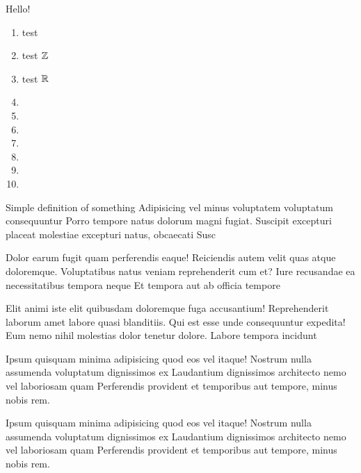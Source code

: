 \documentclass{article}
\begin{document}
    \maketitle[small]
    Hello!
    \begin{enumerate}[label=\listALPHP]
        \item test \nsN{}
        \item test \(\mathbb{Z}{}\)
        \item test \(\mathbb{R}{}\)
        \item {}
        \item {}    
        \item {}
        \item {}
        \item {}  
        \item {} 
        \item {} 
    \end{enumerate}
    \begin{definition}
        Simple definition of something Adipisicing vel minus voluptatem voluptatum consequuntur Porro tempore natus dolorum magni fugiat. Suscipit excepturi placeat molestiae excepturi natus, obcaecati Susc
    \end{definition}
    \begin{theorem}
        Dolor earum fugit quam perferendis eaque! Reiciendis autem velit quas atque doloremque. Voluptatibus natus veniam reprehenderit cum et? Iure recusandae ea necessitatibus tempora neque Et tempora aut ab officia tempore
    \end{theorem}
    \begin{lemma}
        Elit animi iste elit quibusdam doloremque fuga accusantium! Reprehenderit laborum amet labore quasi blanditiis. Qui est esse unde consequuntur expedita! Eum nemo nihil molestias dolor tenetur dolore. Labore tempora incidunt
    \end{lemma}
    \begin{corollary}
        Ipsum quisquam minima adipisicing quod eos vel itaque! Nostrum nulla assumenda voluptatum dignissimos ex Laudantium dignissimos architecto nemo vel laboriosam quam Perferendis provident et temporibus aut tempore, minus nobis rem.
    \end{corollary}
    \begin{proposition}
        Ipsum quisquam minima adipisicing quod eos vel itaque! Nostrum nulla assumenda voluptatum dignissimos ex Laudantium dignissimos architecto nemo vel laboriosam quam Perferendis provident et temporibus aut tempore, minus nobis rem.
    \end{proposition}
\end{document}
